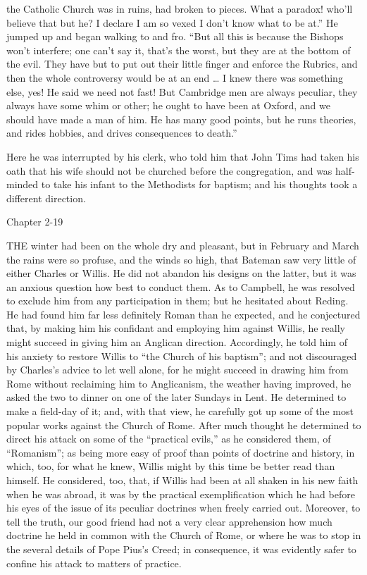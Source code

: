 the Catholic Church was in ruins, had broken to pieces. What a
paradox! who'll believe that but he? I declare I am so vexed I don't
know what to be at.'' He jumped up and began walking to and fro.
``But all this is because the Bishops won't interfere; one can't
say it, that's the worst, but they are at the bottom of the evil. They
have but to put out their little finger and enforce the Rubrics, and
then the whole controversy would be at an end … I knew there was
something else, yes! He said we need not fast! But Cambridge men are
always peculiar, they always have some whim or other; he ought to have
been at Oxford, and we should have made a man of him. He has many good
points, but he runs theories, and rides hobbies, and drives
consequences to death.''

Here he was interrupted by his clerk, who told him that John Tims
had taken his oath that his wife should not be churched before the
congregation, and was half-minded to take his infant to the Methodists
for baptism; and his thoughts took a different direction.

Chapter 2-19


THE winter had been on the whole dry
and pleasant, but in February and March the rains were so profuse, and
the winds so high, that Bateman saw very little of either Charles or
Willis. He did not abandon his designs on the latter, but it was an
anxious question how best to conduct them. As to Campbell, he was
resolved to exclude him from any participation in them; but he
hesitated about Reding. He had found him far less definitely Roman
than he expected, and he conjectured that, by making him his confidant
and employing him against Willis, he really might succeed in giving
him an Anglican direction. Accordingly, he told him of his anxiety to
restore Willis to ``the Church of his baptism''; and not
discouraged by Charles's advice to let well alone, for he might
succeed in drawing him from Rome without reclaiming him to
Anglicanism, the weather having improved, he asked the two to dinner
on one of the later Sundays in Lent. He determined to make a field-day
of it; and, with that view, he carefully got up some of the most
popular works against the Church of Rome. After much thought he
determined to direct his attack on some of the ``practical
evils,'' as he considered them, of ``Romanism''; as being
more easy of proof than points of doctrine and history, in which, too,
for what he knew, Willis might by this time be better read than
himself. He considered, too, that, if Willis had been at all shaken in
his new faith when he was abroad, it was by the practical
exemplification which he had before his eyes of the issue of its
peculiar doctrines when freely carried out. Moreover, to tell the
truth, our good friend had not a very clear apprehension how much
doctrine he held in common with the Church of Rome, or where he was to
stop in the several details of Pope Pius's Creed; in consequence, it
was evidently safer to confine his attack to matters of practice.

